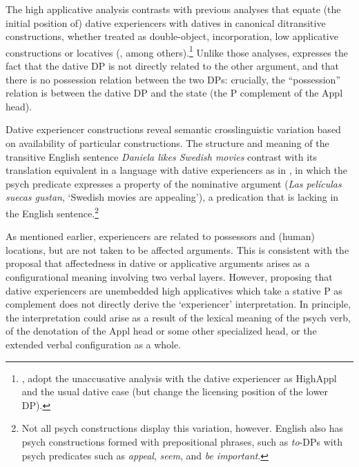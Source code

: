 \documentclass[output=paper,colorlinks,citecolor=brown,nonflat]{./langscibook}
\begin{document}







The high applicative analysis contrasts with previous analyses that equate (the initial position of) dative experiencers with datives in canonical ditransitive constructions, whether treated as double-object, incorporation, low applicative constructions or locatives (\citealt{BellettiRizzi1988, Masullo1992thesis}, among others).\footnote{\citealt{Acedo-MatellánMateu2015}, \citealt{Pujalte2015} adopt the unaccusative analysis with the dative experiencer as HighAppl and the usual dative case (but change the licensing position of the lower DP).}   Unlike those analyses,  expresses the fact that the dative DP is not directly related to the other argument, and that there is no possession relation between the two DPs: crucially, the “possession” relation is between the dative DP and the state (the \liv P complement of the Appl head).

Dative experiencer constructions reveal semantic crosslinguistic variation based on availability of particular constructions. The structure and meaning of the transitive English sentence \textit{Daniela likes Swedish movies} contrast with its translation equivalent in a language with dative experiencers as in , in which the psych predicate expresses a property of the nominative argument (\textit{Las películas suecas gustan}, ‘Swedish movies are appealing’), a predication that is lacking in the English sentence.\footnote{Not all psych constructions display this variation, however. English also has psych constructions formed with prepositional phrases, such as \textit{to}-DPs with psych predicates such as \textit{appeal}, \textit{seem}, and \textit{be important}.}

As mentioned earlier, experiencers are related to possessors and (human) locations, but are not taken to be affected arguments. This is consistent with the proposal that affectedness in dative or applicative arguments arises as a configurational meaning involving two verbal layers. However, proposing that dative experiencers are unembedded high applicatives which take a stative \liv P as complement does not directly derive the ‘experiencer’ interpretation. In principle, the interpretation could arise as a result of the lexical meaning of the psych verb, of the denotation of the Appl head or some other specialized head, or the extended verbal configuration as a whole.
\end{document}
